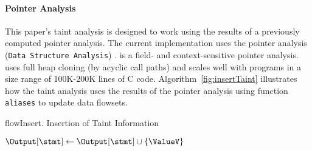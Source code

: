 \paragraph{Pointer Analysis}
This paper's taint analysis is designed to work using the results of
a previously computed pointer analysis.
The current implementation uses the pointer analysis \DSA (\texttt{Data Structure Analysis}) \cite{DSA:PLDI07}.
\DSA is a field- and context-sensitive pointer analysis.
\DSA uses full heap cloning (by acyclic call paths) and 
scales well with programs in a size range of 100K-200K lines of C code. 
Algorithm~\ref{fig:insertTaint} illustrates how the taint analysis uses
the results of the pointer analysis using function \texttt{aliases}
to update data flowsets.

\begin{algorithm}
\caption{flowInsert. Insertion of Taint Information}\label{fig:insertTaint}
\LinesNumbered
\DontPrintSemicolon
{}

\OutData{}
$\Output[\stmt] \leftarrow \Output[\stmt] \cup \{ \ValueV \}$\;
	\ForEach{$\ValueW \in \Aliases(\ValueV)$}{			
		$\Output[\stmt] \leftarrow \Output[\stmt] \cup \{ \ValueW \}$\;
	}
\end{algorithm}

